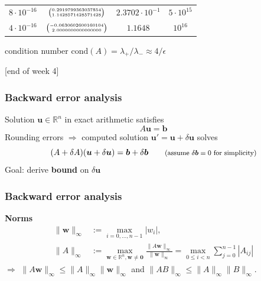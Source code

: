 \documentclass{beamer}
\begin{document}
\begin{frame}[fragile]
\begin{center}
\begin{tabular}{cccc}
  $8\cdot 10^{-16}$ & ${\tiny\begin{pmatrix} 0.2919799363037854 \\1.1428571428571428\end{pmatrix}}$ & $2.3702\cdot 10^{-1}$ & $5\cdot 10^{15}$ \\
  $4\cdot 10^{-16}$ & ${\tiny\begin{pmatrix} -0.0630602600160104 \\ 2.0000000000000000\end{pmatrix}}$ & $1.1648$ & $10^{16}$ \\
  \hline
\end{tabular}
\end{center}
condition number $\text{cond}(A) = \lambda_+/\lambda_-\approx 4/\epsilon$
{\begin{flushright} {\footnotesize [end of week 4]} \end{flushright}}
\end{frame}


\begin{frame}
\frametitle{Backward error analysis}
Solution $\boldsymbol{u}\in\mathbb{R}^n$ in exact arithmetic satisfies
$$
A\boldsymbol{u} = \boldsymbol{b}
$$
Rounding errors $\Rightarrow$ computed solution $\boldsymbol{u}'=\boldsymbol{u}+\delta\boldsymbol{u}$ solves
$$
(A+\delta A)(\boldsymbol{u}+\delta\boldsymbol{u}) = \boldsymbol{b} + \delta\boldsymbol{b}
\qquad\text{\footnotesize(assume $\delta\boldsymbol{b}=0$ for simplicity)}
$$
Goal: derive \textbf{bound} on $\delta\boldsymbol{u}$ \\[1ex]
\end{frame}


\begin{frame}
\frametitle{Backward error analysis}
\textbf{Norms}
$$
\begin{aligned}
\|\boldsymbol{w}\|_\infty &:= \max_{i=0,\dots,n-1} |w_i|,\\
\|A\|_\infty &:= \max_{\boldsymbol{w}\in\mathbb{R}^n,\boldsymbol{w}\neq \boldsymbol{0}} \frac{\|A\boldsymbol{w}\|_\infty}{\|\boldsymbol{w}\|_\infty} = \max_{0\le i < n} \sum_{j=0}^{n-1} |A_{ij}|
\end{aligned}
$$
$\Rightarrow$ $\|A\boldsymbol{w}\|_\infty\le \|A\|_\infty\|\boldsymbol{w}\|_\infty$ and $\|AB\|_\infty\le\|A\|_\infty\|B\|_\infty$.
\end{frame}
\end{document}
